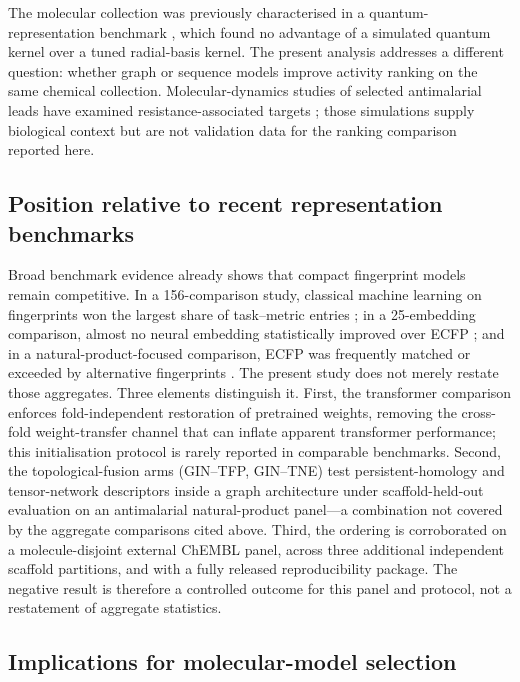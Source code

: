 \documentclass[11pt,a4paper]{article}
\begin{document}
The molecular collection was previously characterised in a quantum-representation benchmark \citep{temgoua2027quantum}, which found no advantage of a simulated quantum kernel over a tuned radial-basis kernel. The present analysis addresses a different question: whether graph or sequence models improve activity ranking on the same chemical collection. Molecular-dynamics studies of selected antimalarial leads have examined resistance-associated targets \citep{temgoua2027md}; those simulations supply biological context but are not validation data for the ranking comparison reported here.

\subsection{Position relative to recent representation benchmarks}

Broad benchmark evidence already shows that compact fingerprint models remain competitive. In a \num{156}-comparison study, classical machine learning on fingerprints won the largest share of task--metric entries \citep{guo_ding_2026}; in a \num{25}-embedding comparison, almost no neural embedding statistically improved over ECFP \citep{benchmark_pretrained_2025}; and in a natural-product-focused comparison, ECFP was frequently matched or exceeded by alternative fingerprints \citep{boldini2024}. The present study does not merely restate those aggregates. Three elements distinguish it. First, the transformer comparison enforces fold-independent restoration of pretrained weights, removing the cross-fold weight-transfer channel that can inflate apparent transformer performance; this initialisation protocol is rarely reported in comparable benchmarks. Second, the topological-fusion arms (GIN--TFP, GIN--TNE) test persistent-homology and tensor-network descriptors inside a graph architecture under scaffold-held-out evaluation on an antimalarial natural-product panel---a combination not covered by the aggregate comparisons cited above. Third, the ordering is corroborated on a molecule-disjoint external ChEMBL panel, across three additional independent scaffold partitions, and with a fully released reproducibility package. The negative result is therefore a controlled outcome for this panel and protocol, not a restatement of aggregate statistics.

\subsection{Implications for molecular-model selection}
\end{document}

